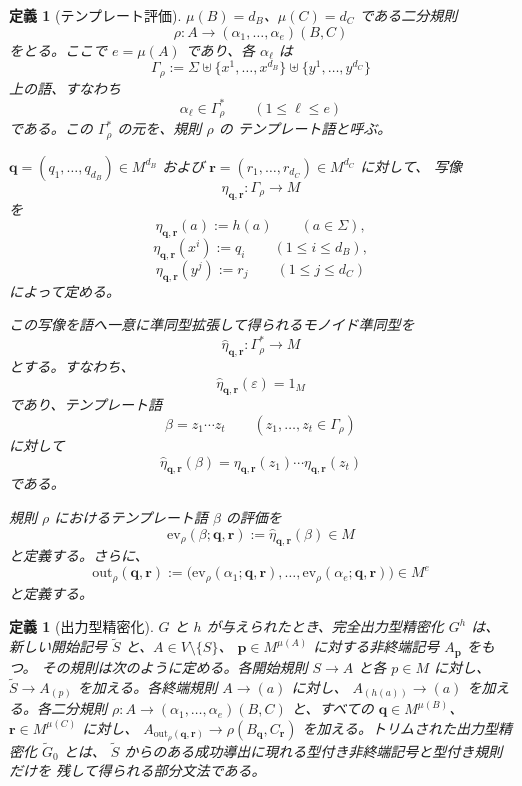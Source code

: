 \documentclass[11pt,a4paper]{ltjsarticle}
\newtheorem{definition}[theorem]{定義}
\theoremstyle{remark}
\newcommand{\out}{\mathrm{out}}
\newcommand{\ev}{\mathrm{ev}}
\newcommand{\eps}{\varepsilon}
\begin{document}
\begin{definition}[テンプレート評価]
\label{def:output-map}
\(\mu(B)=d_B\)、\(\mu(C)=d_C\) である二分規則
\[
  \rho\colon
  A\to(\alpha_1,\ldots,\alpha_e)(B,C)
\]
をとる。ここで \(e=\mu(A)\) であり、各 \(\alpha_\ell\) は
\[
  \Gamma_\rho
  :=
  \Sigma
  \uplus
  \{x^1,\ldots,x^{d_B}\}
  \uplus
  \{y^1,\ldots,y^{d_C}\}
\]
上の語、すなわち
\[
  \alpha_\ell\in\Gamma_\rho^*
  \qquad (1\le \ell\le e)
\]
である。この \(\Gamma_\rho^*\) の元を、規則 \(\rho\) の
\emph{テンプレート語}と呼ぶ。

\(\mathbf q=(q_1,\ldots,q_{d_B})\in M^{d_B}\) および
\(\mathbf r=(r_1,\ldots,r_{d_C})\in M^{d_C}\) に対して、
写像
\[
  \eta_{\mathbf q,\mathbf r}\colon\Gamma_\rho\to M
\]
を
\[
  \eta_{\mathbf q,\mathbf r}(a):=h(a)
  \qquad (a\in\Sigma),
\]
\[
  \eta_{\mathbf q,\mathbf r}(x^i):=q_i
  \qquad (1\le i\le d_B),
\]
\[
  \eta_{\mathbf q,\mathbf r}(y^j):=r_j
  \qquad (1\le j\le d_C)
\]
によって定める。

この写像を語へ一意に準同型拡張して得られるモノイド準同型を
\[
  \widehat{\eta}_{\mathbf q,\mathbf r}
  \colon
  \Gamma_\rho^*\to M
\]
とする。すなわち、
\[
  \widehat{\eta}_{\mathbf q,\mathbf r}(\eps)=1_M
\]
であり、テンプレート語
\[
  \beta=z_1\cdots z_t
  \qquad (z_1,\ldots,z_t\in\Gamma_\rho)
\]
に対して
\[
  \widehat{\eta}_{\mathbf q,\mathbf r}(\beta)
  =
  \eta_{\mathbf q,\mathbf r}(z_1)
  \cdots
  \eta_{\mathbf q,\mathbf r}(z_t)
\]
である。

規則 \(\rho\) におけるテンプレート語 \(\beta\) の評価を
\[
  \ev_\rho(\beta;\mathbf q,\mathbf r)
  :=
  \widehat{\eta}_{\mathbf q,\mathbf r}(\beta)
  \in M
\]
と定義する。さらに、
\[
  \out_\rho(\mathbf q,\mathbf r)
  :=
  \bigl(
    \ev_\rho(\alpha_1;\mathbf q,\mathbf r),
    \ldots,
    \ev_\rho(\alpha_e;\mathbf q,\mathbf r)
  \bigr)
  \in M^e
\]
と定義する。
\end{definition}

\begin{definition}[出力型精密化]
\label{def:output-refinement}
\(G\) と \(h\) が与えられたとき、完全出力型精密化 \(G^h\) は、新しい開始記号
\(\widetilde S\) と、\(A\in V\setminus\{S\}\)、
\(\mathbf p\in M^{\mu(A)}\) に対する非終端記号 \(A_{\mathbf p}\) をもつ。
その規則は次のように定める。各開始規則 \(S\to A\) と各 \(p\in M\) に対し、
\(\widetilde S\to A_{(p)}\) を加える。各終端規則 \(A\to(a)\) に対し、
\(A_{(h(a))}\to(a)\) を加える。各二分規則
\(\rho\colon A\to(\alpha_1,\ldots,\alpha_e)(B,C)\) と、すべての
\(\mathbf q\in M^{\mu(B)}\)、\(\mathbf r\in M^{\mu(C)}\) に対し、
\(A_{\out_\rho(\mathbf q,\mathbf r)}\to\rho(B_{\mathbf q},C_{\mathbf r})\)
を加える。トリムされた出力型精密化 \(\widetilde G_0\) とは、
\(\widetilde S\) からのある成功導出に現れる型付き非終端記号と型付き規則だけを
残して得られる部分文法である。
\end{definition}
\end{document}
